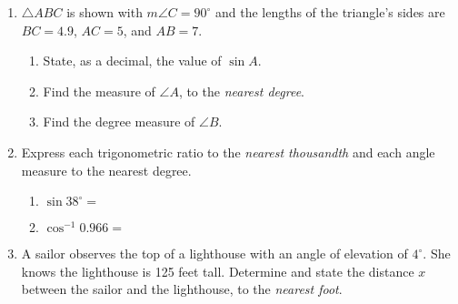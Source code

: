 \documentclass[12pt, twoside]{article}
\begin{document}
\begin{enumerate}
  \item $\triangle ABC$ is shown with $m\angle C=90^\circ$ and the lengths of the triangle's sides are $BC=4.9$, $AC=5$, and $AB=7$.
  \begin{multicols}{2}
        \begin{enumerate}
        \item State, as a decimal, the value of $\sin A$. \vspace{1.25cm}
        \item Find the measure of $\angle A$, to the \emph{nearest degree}. \vspace{1.25cm}
        \item Find the degree measure of $\angle B$.
      \end{enumerate}
    \end{multicols}
    \vspace{1.5cm}

  \item Express each trigonometric ratio to the \emph{nearest thousandth} and each angle measure to the nearest degree.
    \begin{multicols}{2}
      \begin{enumerate}
        \item $\sin 38^\circ =$ \vspace{0.5cm}
        \item $\cos^{-1} 0.966 =$ \vspace{0.5cm}
      \end{enumerate}
    \end{multicols} \vspace{0.25cm}

  \item A sailor observes the top of a lighthouse with an angle of elevation of $4^\circ$. She knows the lighthouse is 125 feet tall. Determine and state the distance $x$ between the sailor and the lighthouse, to the \emph{nearest foot}.\\[0.5cm]
     \vspace{3.25cm}


\end{enumerate}
\end{document}
